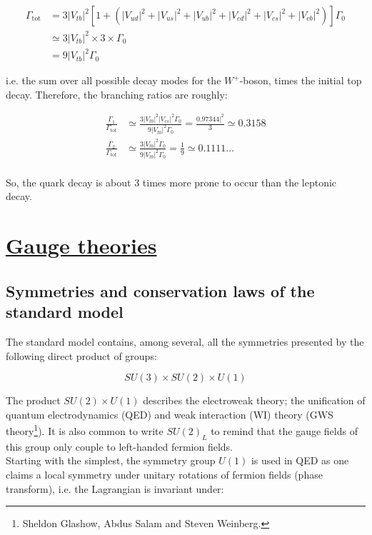 \documentclass[11pt,a4paper]{article}
\begin{document}
\begin{align}
	\Gamma_{\text{tot}} &= 3|V_{tb}|^2\left[1+\left(|V_{ud}|^2+|V_{us}|^2+|V_{ub}|^2+|V_{cd}|^2+|V_{cs}|^2+|V_{cb}|^2\right)\right]\Gamma_0\\
	 &\simeq 3|V_{tb}|^2\times 3\times\Gamma_0\\
	 &= 9|V_{tb}|^2\Gamma_0
\end{align}

i.e. the sum over all possible decay modes for the $W^+$-boson, times the initial top decay. Therefore, the branching ratios are roughly:

\begin{align*}
	\frac{\Gamma_1}{\Gamma_{\text{tot}}} &\simeq \frac{3|V_{tb}|^2|V_{cs}|^2\Gamma_0}{9|V_{tb}|^2\Gamma_0} = \frac{0.97344|^2}{3} \simeq 0.3158\\
	\frac{\Gamma_2}{\Gamma_{\text{tot}}} &\simeq \frac{3|V_{tb}|^2\Gamma_0}{9|V_{tb}|^2\Gamma_0} = \frac{1}{9} \simeq 0.1111\ldots\\
\end{align*}

So, the quark decay is about 3 times more prone to occur than the leptonic decay.

\section{\underline{Gauge theories}}
\subsection{Symmetries and conservation laws of the standard model}
The standard model contains, among several, all the symmetries presented by the following direct product of groups:

\begin{equation}
	SU(3) \times SU(2) \times U(1)
\end{equation}

The product $SU(2) \times U(1)$ describes the electroweak theory; the unification of quantum electrodynamics (QED) and weak interaction (WI) theory (GWS theory\footnote{Sheldon Glashow, Abdus Salam and Steven Weinberg.}). It is also common to write $SU(2)_L$ to remind that the gauge fields of this group only couple to left-handed fermion fields.\\

Starting with the simplest, the symmetry group $U(1)$ is used in QED as one claims a local symmetry under unitary rotations of fermion fields (phase transform), i.e. the Lagrangian is invariant under:
\end{document}
